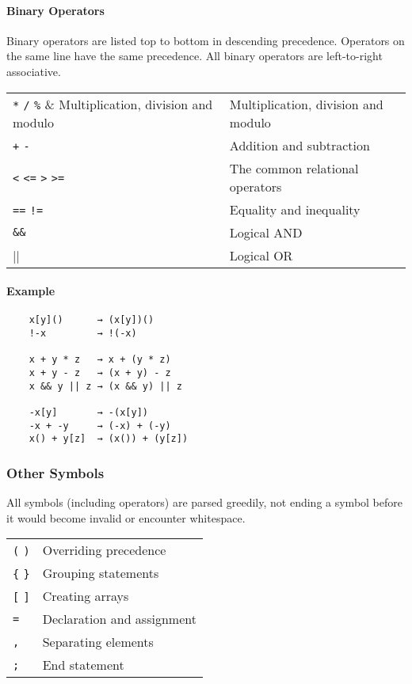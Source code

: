 \paragraph{Binary Operators}

Binary operators are listed top to bottom in descending precedence. Operators on the same line have the same precedence. All binary operators are left-to-right associative.

\begin{table}[H]
    \begin{tabular}{ l l }
        \verb|*| \verb|/| \verb|%|            & Multiplication, division and modulo \\
        \verb|+| \verb|-|                     & Addition and subtraction            \\
        \verb|<| \verb|<=| \verb|>| \verb|>=| & The common relational operators     \\
        \verb|==| \verb|!=|                   & Equality and inequality             \\
        \verb|&&|                             & Logical AND                         \\
        \verb||||                             & Logical OR
    \end{tabular}
\end{table}

\paragraph{Example}

\begin{verbatim}
    x[y]()      → (x[y])()
    !-x         → !(-x)

    x + y * z   → x + (y * z)
    x + y - z   → (x + y) - z
    x && y || z → (x && y) || z

    -x[y]       → -(x[y])
    -x + -y     → (-x) + (-y)
    x() + y[z]  → (x()) + (y[z])
\end{verbatim}

\subsubsection{Other Symbols}

All symbols (including operators) are parsed greedily, not ending a symbol before it would become invalid or encounter whitespace.

\begin{table}[H]
    \begin{tabular}{ l l }
        \verb|(| \verb|)| & Overriding precedence      \\
        \verb|{| \verb|}| & Grouping statements        \\
        \verb|[| \verb|]| & Creating arrays            \\
        \verb|=|          & Declaration and assignment \\
        \verb|,|          & Separating elements        \\
        \verb|;|          & End statement
    \end{tabular}
\end{table}

